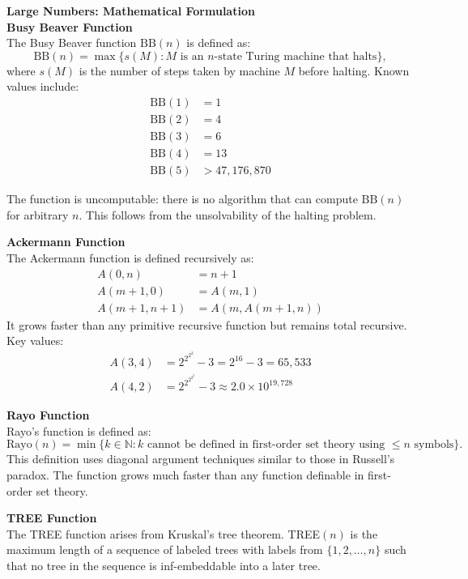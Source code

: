 \begin{technical}
{\Large\textbf{Large Numbers: Mathematical Formulation}}\\[0.7em]

\textbf{Busy Beaver Function}\\[0.5em]
The Busy Beaver function $\text{BB}(n)$ is defined as:
$$
\text{BB}(n) = \max\{s(M) : M \text{ is an $n$-state Turing machine that halts}\},
$$
where $s(M)$ is the number of steps taken by machine $M$ before halting. Known values include:
\begin{align}
\text{BB}(1) &= 1\\
\text{BB}(2) &= 4\\
\text{BB}(3) &= 6\\
\text{BB}(4) &= 13\\
\text{BB}(5) &> 47{,}176{,}870
\end{align}

The function is uncomputable: there is no algorithm that can compute $\text{BB}(n)$ for arbitrary $n$. This follows from the unsolvability of the halting problem.

\textbf{Ackermann Function}\\[0.5em]
The Ackermann function is defined recursively as:
\begin{align}
A(0, n) &= n + 1\\
A(m+1, 0) &= A(m, 1)\\
A(m+1, n+1) &= A(m, A(m+1, n))
\end{align}
It grows faster than any primitive recursive function but remains total recursive. Key values:
\begin{align}
A(3, 4) &= 2^{2^{2^2}} - 3 = 2^{16} - 3 = 65{,}533\\
A(4, 2) &= 2^{2^{2^{2^2}}} - 3 \approx 2.0 \times 10^{19{,}728}
\end{align}

\textbf{Rayo Function}\\[0.5em]
Rayo's function is defined as:
$$
\text{Rayo}(n) = \min\{k \in \mathbb{N} : k \text{ cannot be defined in first-order set theory using } \leq n \text{ symbols}\}.
$$
This definition uses diagonal argument techniques similar to those in Russell's paradox. The function grows much faster than any function definable in first-order set theory.

\textbf{TREE Function}\\[0.5em]
The TREE function arises from Kruskal's tree theorem. TREE$(n)$ is the maximum length of a sequence of labeled trees with labels from $\{1, 2, \ldots, n\}$ such that no tree in the sequence is inf-embeddable into a later tree.


\end{technical}
